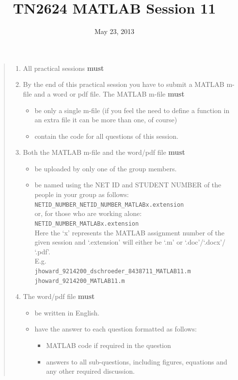 \documentclass[11pt]{article}
\begin{document}
\title{TN2624 MATLAB Session 11}
\date{May 23, 2013}
\maketitle
\begin{quote} 
\begin{enumerate}
\item All practical sessions \textbf{must}
\item By the end of this practical session you have to submit a MATLAB m-file and a word or pdf file. The MATLAB m-file \textbf{must}
\begin{itemize}
\item be only a single m-file (if you feel the need to define a function in an extra file it can be more than one, of course)
\item contain the code for all questions of this session.
\end{itemize}

\item Both the MATLAB m-file and the word/pdf file \textbf{must}
\begin{itemize}
\item be uploaded by only one of the group members.
\item be named using the {\color{red}NET ID} and {\color{red}STUDENT NUMBER} of the people in your group as follows:\\
	{\color{red}\verb|NETID_NUMBER_NETID_NUMBER_MATLABx.extension|}\\
	or, for those who are working alone:\\
	{\color{red}\verb|NETID_NUMBER_MATLABx.extension|}\\
Here the ‘x’ represents the MATLAB assignment number of the given session and ‘.extension’ will either be ‘.m’ or ‘.doc’/‘.docx’/ ‘.pdf’.\\
E.g.\\
\verb|jhoward_9214200_dschroeder_8438711_MATLAB11.m|\\
\verb|jhoward_9214200_MATLAB11.m|
\end{itemize}

\item The word/pdf file \textbf{must}
\begin{itemize}
\item be written in English.
\item have the answer to each question formatted as follows: 
	\begin{itemize}
	\item MATLAB code if required in the question
	\item answers to all sub-questions, including figures, equations and any other required discussion.
	\end{itemize}
\end{itemize}


\end{enumerate}
\end{quote}
\end{document}

